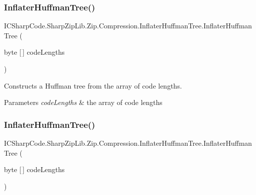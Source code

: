 \subsubsection{\texorpdfstring{Inflater\+Huffman\+Tree()}{InflaterHuffmanTree()}\hspace{0.1cm}{\footnotesize\ttfamily [1/2]}}
{\footnotesize\ttfamily I\+C\+Sharp\+Code.\+Sharp\+Zip\+Lib.\+Zip.\+Compression.\+Inflater\+Huffman\+Tree.\+Inflater\+Huffman\+Tree (\begin{DoxyParamCaption}\item[{byte \mbox{[}$\,$\mbox{]}}]{code\+Lengths }\end{DoxyParamCaption})\hspace{0.3cm}{\ttfamily [inline]}}



Constructs a Huffman tree from the array of code lengths. 


\begin{DoxyParams}{Parameters}
{\em code\+Lengths} & the array of code lengths \\
\hline
\end{DoxyParams}
\mbox{\label{class_i_c_sharp_code_1_1_sharp_zip_lib_1_1_zip_1_1_compression_1_1_inflater_huffman_tree_a75f3f45273de2a95bb3f3ea01447c382}} 
\subsubsection{\texorpdfstring{Inflater\+Huffman\+Tree()}{InflaterHuffmanTree()}\hspace{0.1cm}{\footnotesize\ttfamily [2/2]}}
{\footnotesize\ttfamily I\+C\+Sharp\+Code.\+Sharp\+Zip\+Lib.\+Zip.\+Compression.\+Inflater\+Huffman\+Tree.\+Inflater\+Huffman\+Tree (\begin{DoxyParamCaption}\item[{byte \mbox{[}$\,$\mbox{]}}]{code\+Lengths }\end{DoxyParamCaption})\hspace{0.3cm}{\ttfamily [inline]}}




